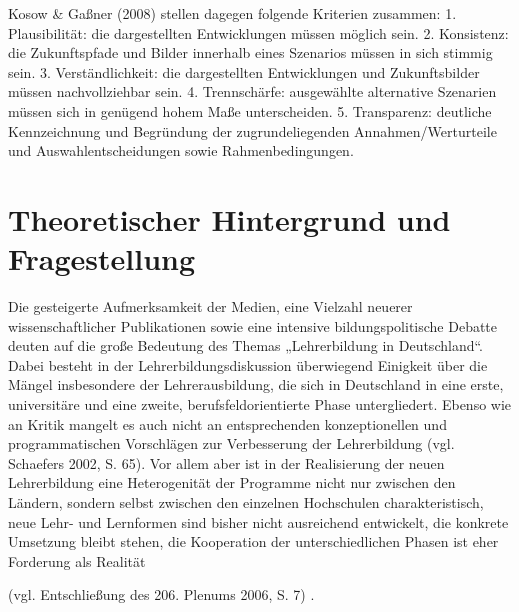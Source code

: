 \documentclass[12pt,a4paper]{article}
\begin{document}
Kosow \& Gaßner (2008) stellen dagegen folgende Kriterien zusammen: 
1. Plausibilität: die dargestellten Entwicklungen müssen möglich sein. 
2. Konsistenz: die Zukunftspfade und Bilder innerhalb eines Szenarios müssen in sich stimmig sein. 
3. Verständlichkeit: die dargestellten Entwicklungen und Zukunftsbilder müssen nachvollziehbar sein. 
4. Trennschärfe: ausgewählte alternative Szenarien müssen sich in genügend hohem Maße unterscheiden. 
5. Transparenz: deutliche Kennzeichnung und Begründung der zugrundeliegenden Annahmen/Werturteile und Auswahlentscheidungen sowie Rahmenbedingungen. 

\section{Theoretischer Hintergrund und Fragestellung} 

Die gesteigerte Aufmerksamkeit der Medien, eine Vielzahl neuerer wissenschaftlicher Publikationen sowie eine intensive bildungspolitische Debatte deuten auf die große Bedeutung des Themas „Lehrerbildung in Deutschland“. Dabei besteht in der Lehrerbildungsdiskussion überwiegend Einigkeit über die Mängel insbesondere der Lehrerausbildung, die sich in Deutschland in eine erste, universitäre und eine zweite, berufsfeldorientierte Phase untergliedert. Ebenso wie an Kritik mangelt es auch nicht an entsprechenden konzeptionellen und programmatischen Vorschlägen zur Verbesserung der Lehrerbildung (vgl. Schaefers 2002, S. 65)\cite{Christine2002}. Vor allem aber ist in der Realisierung der neuen Lehrerbildung eine Heterogenität der Programme nicht nur zwischen den Ländern, sondern selbst zwischen den einzelnen Hochschulen charakteristisch, neue Lehr- und Lernformen sind bisher nicht ausreichend entwickelt, die konkrete Umsetzung bleibt stehen, die Kooperation der unterschiedlichen Phasen ist eher Forderung als Realität

(vgl. Entschließung des 206. Plenums 2006, S. 7) \cite{Hochschulrektorenkonferenz2006}. 
 
\end{document}
